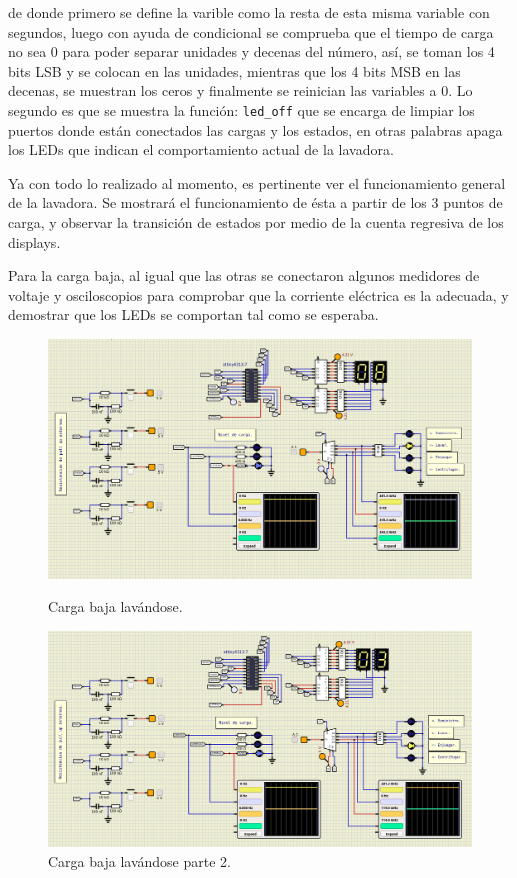 
de donde primero se define la varible como la resta de esta misma variable con segundos, luego con ayuda de condicional se comprueba que el tiempo de carga no sea 0 para poder separar unidades y decenas del número, así, se toman los 4 bits LSB y se colocan en las unidades, mientras que los 4 bits MSB en las decenas, se muestran los ceros y finalmente se reinician las variables a 0. Lo segundo es que se muestra la función: \texttt{led\_off} que se encarga de limpiar los puertos donde están conectados las cargas y los estados, en otras palabras apaga los LEDs que indican el comportamiento actual de la lavadora.\par
Ya con todo lo realizado al momento, es pertinente ver el funcionamiento general de la lavadora. Se mostrará el funcionamiento de ésta a partir de los 3 puntos de carga, y observar la transición de estados por medio de la cuenta regresiva de los displays.\par
Para la carga baja, al igual que las otras se conectaron algunos medidores de voltaje y osciloscopios para comprobar que la corriente eléctrica es la adecuada, y demostrar que los LEDs se comportan tal como se esperaba.
\begin{figure}[H]
   \begin{minipage}{0.48\textwidth}
     \centering
     \includegraphics[width=.7\linewidth]{Imagenes/11.png}
     \caption{Carga baja lavándose.}\label{F17}
   \end{minipage}\hfill
   \begin{minipage}{0.48\textwidth}
     \centering
     \includegraphics[width=.7\linewidth]{Imagenes/12.png}
     \caption{Carga baja lavándose parte 2. }\label{F18}
   \end{minipage}
\end{figure}
